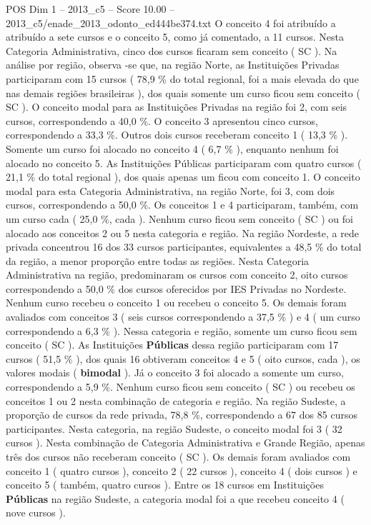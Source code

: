\begin{textsample}{POS Dim 1 – 2013\_c5 – Score 10.00 – 2013\_c5/enade\_2013\_odonto\_ed444be374.txt}
O conceito 4 foi atribuído a atribuído a sete cursos e o conceito 5, como já comentado, a 11 cursos.
Nesta Categoria Administrativa, cinco dos cursos ficaram sem conceito ( SC ).
Na análise por região, observa -se que, na região Norte, as Instituições Privadas participaram com 15 cursos ( 78,9 \% do total regional, foi a mais elevada do que nas demais regiões brasileiras ), dos quais somente um curso ficou sem conceito ( SC ).
O conceito modal para as Instituições Privadas na região foi 2, com seis cursos, correspondendo a 40,0 \%.
O conceito 3 apresentou cinco cursos, correspondendo a 33,3 \%.
Outros dois cursos receberam conceito 1 ( 13,3 \% ).
Somente um curso foi alocado no conceito 4 ( 6,7 \% ), enquanto nenhum foi alocado no conceito 5.
As Instituições Públicas participaram com quatro cursos ( 21,1 \% do total regional ), dos quais apenas um ficou com conceito 1.
O conceito modal para esta Categoria Administrativa, na região Norte, foi 3, com dois cursos, correspondendo a 50,0 \%.
Os conceitos 1 e 4 participaram, também, com um curso cada ( 25,0 \%, cada ).
Nenhum curso ficou sem conceito ( SC ) ou foi alocado aos conceitos 2 ou 5 nesta categoria e região.
Na região Nordeste, a rede privada concentrou 16 dos 33 cursos participantes, equivalentes a 48,5 \% do total da região, a menor proporção entre todas as regiões.
Nesta Categoria Administrativa na região, predominaram os cursos com conceito 2, oito cursos correspondendo a 50,0 \% dos cursos oferecidos por IES Privadas no Nordeste.
Nenhum curso recebeu o conceito 1 ou recebeu o conceito 5.
Os demais foram avaliados com conceitos 3 ( seis cursos correspondendo a 37,5 \% ) e 4 ( um curso correspondendo a 6,3 \% ).
Nessa categoria e região, somente um curso ficou sem conceito ( SC ).
As Instituições \textbf{Públicas} dessa região participaram com 17 cursos ( 51,5 \% ), dos quais 16 obtiveram conceitos 4 e 5 ( oito cursos, cada ), os valores modais ( \textbf{bimodal} ).
Já o conceito 3 foi alocado a somente um curso, correspondendo a 5,9 \%.
Nenhum curso ficou sem conceito ( SC ) ou recebeu os conceitos 1 ou 2 nesta combinação de categoria e região.
Na região Sudeste, a proporção de cursos da rede privada, 78,8 \%, correspondendo a 67 dos 85 cursos participantes.
Nesta categoria, na região Sudeste, o conceito modal foi 3 ( 32 cursos ).
Nesta combinação de Categoria Administrativa e Grande Região, apenas três dos cursos não receberam conceito ( SC ).
Os demais foram avaliados com conceito 1 ( quatro cursos ), conceito 2 ( 22 cursos ), conceito 4 ( dois cursos ) e conceito 5 ( também, quatro cursos ).
Entre os 18 cursos em Instituições \textbf{Públicas} na região Sudeste, a categoria modal foi a que recebeu conceito 4 ( nove cursos ).

\end{textsample}
